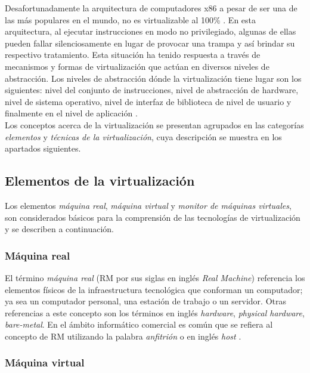 Desafortunadamente la arquitectura de computadores x86 a pesar de ser una de las más populares en el mundo, no es virtualizable al 100\% \parencite{Adams}. En esta arquitectura, al ejecutar instrucciones en modo no privilegiado, algunas de ellas pueden fallar silenciosamente en lugar de provocar una trampa y así brindar su respectivo tratamiento. Esta situación ha tenido respuesta a través de mecanismos y formas de virtualización que actúan en diversos niveles de abstracción. Los niveles de abstracción dónde la virtualización tiene lugar son los siguientes: nivel del conjunto de instrucciones, nivel de abstracción de hardware, nivel de sistema operativo, nivel de interfaz de biblioteca de nivel de usuario y finalmente en el nivel de aplicación \parencite{Chiueh2005}.\\

Los conceptos acerca de la virtualización se presentan agrupados en las categorías \textit{elementos} y  \textit{técnicas de la virtualización}, cuya descripción se muestra en los apartados siguientes.


\subsection{Elementos de la virtualización}

Los elementos \textit{máquina real}, \textit{máquina virtual} y \textit{monitor de máquinas virtuales}, son considerados básicos para la comprensión de las tecnologías de virtualización y se describen a continuación.

\subsubsection{Máquina real}

El término \textit{máquina real} (RM por sus siglas en inglés \textit{Real Machine}) referencia los elementos físicos de la infraestructura tecnológica que conforman un computador; ya sea un computador personal, una estación de trabajo o un servidor. Otras referencias a este concepto son los términos en inglés \textit{hardware}, \textit{physical hardware}, \textit{bare-metal}. En el ámbito informático comercial es común que se refiera al concepto de RM utilizando la palabra \textit{anfitrión} o en inglés \textit{host} \parencite{VMware2008}. 

\subsubsection{Máquina virtual}

